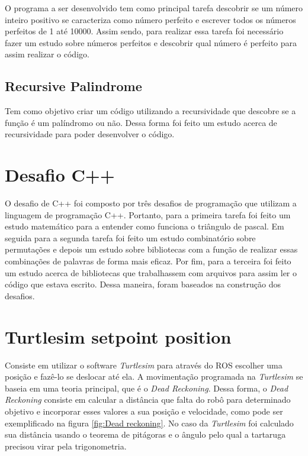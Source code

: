 O programa a ser desenvolvido tem como principal tarefa descobrir se um número inteiro positivo se caracteriza como número perfeito e escrever todos os números perfeitos de 1 até 10000. Assim sendo, para realizar essa tarefa foi necessário fazer um estudo sobre números perfeitos e descobrir qual número é perfeito para assim realizar o código.

\subsection{Recursive Palindrome}

Tem como objetivo criar um código utilizando a recursividade que descobre se a função é um palíndromo ou não. Dessa forma foi feito um estudo acerca de recursividade para poder desenvolver o código.


\section{Desafio C++}
O desafio de C++ foi composto por três desafios de programação que utilizam a linguagem de programação C++. Portanto, para a primeira tarefa foi feito um estudo matemático para a entender como funciona o triângulo de pascal. Em seguida para a segunda tarefa foi feito um estudo combinatório sobre permutações e depois um estudo sobre bibliotecas  com a função de realizar essas combinações de palavras de forma mais eficaz. Por fim, para a terceira foi feito um estudo acerca de bibliotecas que trabalhassem com arquivos para assim ler o código que estava escrito. Dessa maneira, foram baseados na construção dos desafios.

\section{Turtlesim setpoint position}
Consiste em utilizar o software \textit{Turtlesim} para através do ROS escolher uma posição e fazê-lo se deslocar até ela. A movimentação programada na \textit{Turtlesim} se baseia em uma teoria principal, que é o \textit{Dead Reckoning}. Dessa forma, o \textit{Dead Reckoning} consiste em calcular a distância que falta do robô para determinado objetivo e incorporar esses valores a sua posição e velocidade, como pode ser exemplificado na figura \ref{fig:Dead reckoning}. No caso da \textit{Turtlesim} foi calculado sua distância usando o teorema de pitágoras e o ângulo pelo qual a tartaruga precisou virar pela trigonometria.


